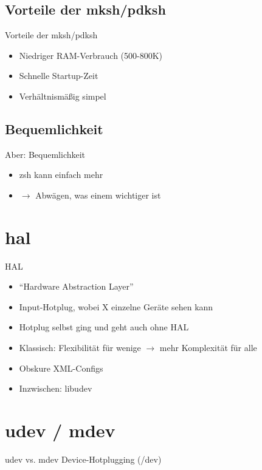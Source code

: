 \documentclass{beamer}
\begin{document}
\subsection{Vorteile der mksh/pdksh}
\begin{frame}{Vorteile der mksh/pdksh}
	\begin{itemize}
		\item Niedriger RAM-Verbrauch (500-800K)
		\pause \item Schnelle Startup-Zeit %
		\pause \item Verhältnismäßig simpel
	\end{itemize}
\end{frame}

\subsection{Bequemlichkeit}
\begin{frame}{Aber: Bequemlichkeit}
	\begin{itemize}
		\item zsh kann einfach mehr
		\pause \item $\rightarrow$ Abwägen, was einem wichtiger ist
	\end{itemize}
\end{frame}

\section{hal}
\begin{frame}{HAL}
	\begin{itemize}
		\item ``Hardware Abstraction Layer''
		\pause \item Input-Hotplug, wobei X einzelne Geräte sehen kann
		\pause \item Hotplug selbst ging und geht auch ohne HAL
		\pause \item Klassisch: Flexibilität für wenige $\rightarrow$ mehr
			Komplexität für alle
		\pause \item Obskure XML-Configs
		\pause \item Inzwischen: libudev
	\end{itemize}
\end{frame}

\section{udev / mdev}
\begin{frame}{udev vs. mdev}
	Device-Hotplugging (/dev)
\end{frame}
\end{document}
